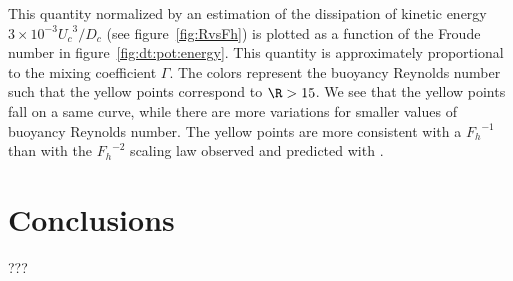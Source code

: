 This quantity normalized by an estimation of the dissipation of kinetic energy
$3\times10^{-3} {U_c}^3/D_c$ (see figure~\ref{fig:RvsFh}) is plotted as a
function of the Froude number in figure~\ref{fig:dt:pot:energy}. This quantity
is approximately proportional to the mixing coefficient $\Gamma$. The colors
represent the buoyancy Reynolds number such that the yellow points correspond
to $\R > 15$. We see that the yellow points fall on a same curve, while there
are more variations for smaller values of buoyancy Reynolds number. The yellow
points are more consistent with a ${F_h}^{-1}$ than with the ${F_h}^{-2}$
scaling law observed and predicted with \cite{Maffioli2016}.

\section{Conclusions}

???
